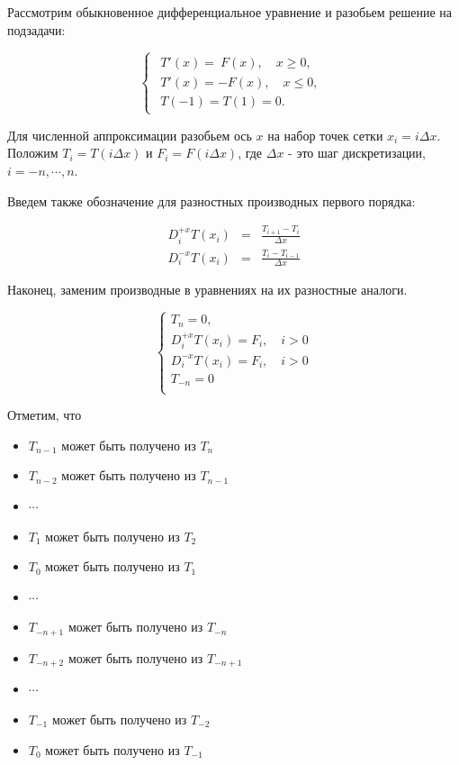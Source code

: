 \documentclass[a4paper,12pt]{article}
\begin{document}
Рассмотрим обыкновенное дифференциальное уравнение и разобьем решение
на подзадачи:

\begin{equation*}
  \begin{cases}
      \begin{array}{ll}
        T'(x) = ~F(x), \quad x \ge 0,\\
        T'(x) = -F(x), \quad x \le 0,\\[0.3cm]
        T(-1)= T(1) = 0.
      \end{array}
    \end{cases}
\end{equation*}

Для численной аппроксимации разобьем ось $x$ на набор точек сетки
$x_i=i\Delta x$. Положим $T_i = T(i \Delta x)$ и
$F_i = F(i \Delta x)$, где $\Delta x$ - это шаг дискретизации,
$i = -n, \cdots, n$.

Введем также обозначение для разностных производных первого порядка:

\begin{eqnarray*}
    D^{+x}_iT(x_i) &=& \frac{T_{i+1} - T_{i}}{\Delta x} \\
    D^{-x}_iT(x_i) &=& \frac{T_{i} - T_{i-1}}{\Delta x}
\end{eqnarray*}

Наконец, заменим производные в уравнениях на их разностные аналоги.

\begin{equation}
  \label{eq:discretise}
  \begin{cases}
      T_n = 0,\\
      D^{+x}_iT(x_i) = F_i, \quad i>0 \\
      D^{-x}_iT(x_i)  = F_i, \quad i>0\\
      T_{-n} = 0\\
    \end{cases}
\end{equation}

Отметим, что
\begin{itemize}
\item[ ] $T_{n-1}$ может быть получено из $T_n$
\item[ ] $T_{n-2}$ может быть получено из $T_{n-1}$
\item[ ]  $\cdots$
\item[ ] $T_{1}$ может быть получено из $T_2$
\item[ ] $T_{0}$ может быть получено из $T_{1}$
\item[ ]  $\cdots$
\item[ ] $T_{-n+1}$ может быть получено из $T_{-n}$
\item[ ] $T_{-n+2}$ может быть получено из $T_{-n+1}$
\item[ ]  $\cdots$
\item[ ] $T_{-1}$ может быть получено из $T_{-2}$
\item[ ] $T_{0}$ может быть получено из $T_{-1}$

\end{itemize}
\end{document}
